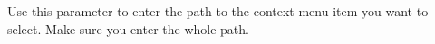 
Use this parameter to enter the path to the context menu item you want to select. Make sure you enter the whole path. 

